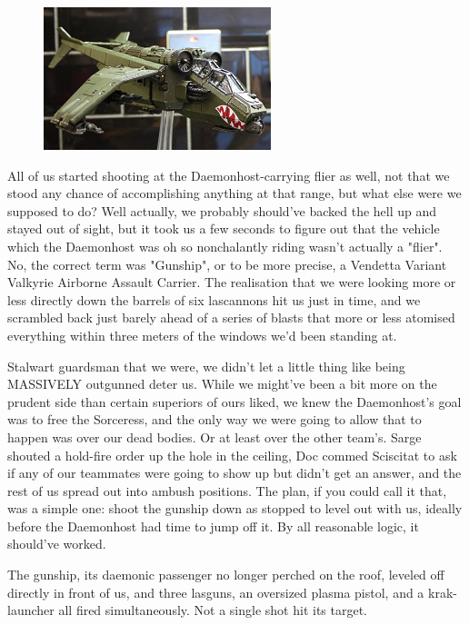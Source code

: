 \begin{figure}
	\begin{center}
		\includegraphics[width=\figwidth]{pics/18/68.png}
	\end{center}
\end{figure}
All of us started shooting at the Daemonhost-carrying flier as well, not that we stood any chance of accomplishing anything at that range, but what else were we supposed to do? 
Well actually, we probably should've backed the hell up and stayed out of sight, but it took us a few seconds to figure out that the vehicle which the Daemonhost was oh so nonchalantly riding wasn't actually a "flier". 
No, the correct term was "Gunship", or to be more precise, a Vendetta Variant Valkyrie Airborne Assault Carrier. 
The realisation that we were looking more or less directly down the barrels of six lascannons hit us just in time, and we scrambled back just barely ahead of  a series of blasts that more or less atomised everything within three meters of the windows we'd been standing at.

Stalwart guardsman that we were, we didn't let a little thing like being MASSIVELY outgunned deter us. 
While we might've been a bit more on the prudent side than certain superiors of ours liked, we knew the Daemonhost's goal was to free the Sorceress, and the only way we were going to allow that to happen was over our dead bodies. 
Or at least over the other team's. 
Sarge shouted a hold-fire order up the hole in the ceiling, Doc commed Sciscitat to ask if any of our teammates were going to show up but didn't get an answer, and the rest of us spread out into ambush positions. 
The plan, if you could call it that, was a simple one: 
shoot the gunship down as stopped to level out with us, ideally before the Daemonhost had time to jump off it. 
By all reasonable logic, it should've worked. 


The gunship, its daemonic passenger no longer perched on the roof, leveled off directly in front of us, and three lasguns, an oversized plasma pistol, and a krak-launcher all fired simultaneously. 
Not a single shot hit its target.

